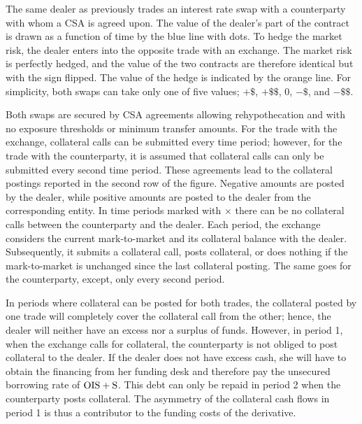 \documentclass[main.tex]{subfiles}
\begin{document}
        \begin{example}
        The same dealer as previously trades an interest rate swap with a counterparty with whom a CSA is agreed upon. 
        The value of the dealer's part of the contract is drawn as a function of time 
        by the \textcolor{wtf-blue}{blue line} with dots.
        To hedge the market risk, the dealer enters into the opposite trade with an exchange.
        The market risk is perfectly hedged, 
        and the value of the two contracts are therefore identical but with the sign flipped.
        The value of the hedge is indicated by the \textcolor{wtf-orange}{orange line}.
        For simplicity, both swaps can take only one of five values; $+\$$, $+\$\$$, $0$, $-\$$, and $-\$\$$.

        Both swaps are secured by CSA agreements allowing rehypothecation 
        and with no exposure thresholds or minimum transfer amounts.
        For the trade with the exchange, collateral calls can be submitted every time period;
        however, for the trade with the counterparty, it is assumed that
        collateral calls can only be submitted every second time period.
        These agreements lead to the collateral postings reported in the second row of the figure.
        Negative amounts are posted by the dealer, while positive amounts are posted to the dealer 
        from the corresponding entity.
        In time periods marked with $\boldsymbol{\times}$ 
        there can be no collateral calls between the counterparty and the dealer.
        Each period, the exchange considers the current mark-to-market and its collateral balance with the dealer.
        Subsequently, it submits a collateral call, posts collateral, 
        or does nothing if the mark-to-market is unchanged since the last collateral posting.
        The same goes for the counterparty, except, only every second period.

        In periods where collateral can be posted for both trades, 
        the collateral posted by one trade will completely cover the collateral call from the other;
        hence, the dealer will neither have an excess nor a surplus of funds.
        However, in period 1, when the exchange calls for collateral,
        the counterparty is not obliged to post collateral to the dealer. 
        If the dealer does not have excess cash, 
        she will have to obtain the financing from her funding desk
        and therefore pay the unsecured borrowing rate of $\OIS/ + \text{S}$. 
        This debt can only be repaid in period 2 when the counterparty posts collateral.
        The asymmetry of the collateral cash flows in period 1
        is thus a contributor to the funding costs of the derivative.


\end{example}
\end{document}
